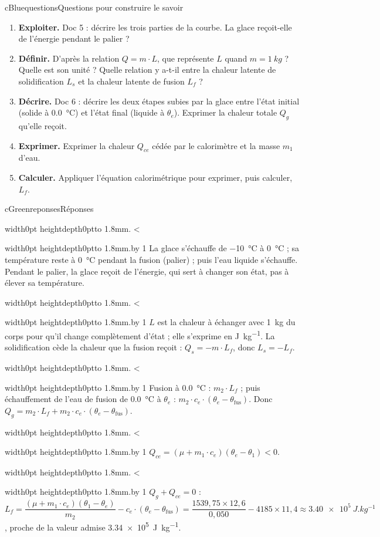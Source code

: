 \documentclass[11pt,a4paper]{article}
\newcommand{\kw}[1]{{\sffamily\bfseries\color{cBlue}#1}}   %
\newif\ifeleve
\newlength{\interligne}\setlength{\interligne}{7mm}
\newlength{\replen}
\newcommand{\pointilles}{{\color{cInk2!60}\leaders\hbox to 1.8mm{\hss.\hss}\hfill}\kern0pt}
\newcommand{\lignes}[1]{\leavevmode\vrule width0pt height\dimexpr\interligne-1mm\relax depth0pt\pointilles
  \lgn=1 \loop\ifnum\lgn<#1 \par\nointerlineskip\noindent\vrule width0pt height\interligne depth0pt\pointilles\advance\lgn by 1 \repeat}
\newcommand{\rep}[1]{%
  \ifeleve
    \sbox{\repbox}{\parbox{\linewidth}{#1}}%
    \replen=\dimexpr\ht\repbox+\dp\repbox\relax
    \repn=\numexpr\replen/\baselineskip+1\relax
    \ifnum\repn<2 \repn=2\fi
    \edef\nblignes{\the\repn}\lignes{\nblignes}%
  \else #1\fi}
\newcommand{\titrereponses}{\ifeleve Mes réponses\else Réponses\fi}
\newcommand{\tfus}{\theta_{\mathrm{fus}}}
\newcommand{\dC}[1]{\qty{#1}{\degreeCelsius}}
\begin{document}
\begin{rub}{cBlue}{questions}{Questions pour construire le savoir}
\begin{enumerate}
  \item \kw{Exploiter.} Doc 5 : décrire les trois parties de la courbe. La glace reçoit-elle de l’énergie pendant le palier ?
  \item \kw{Définir.} D’après la relation $Q = m\cdot L$, que représente $L$ quand $m = \qty{1}{kg}$ ? Quelle est son unité ? Quelle relation y a-t-il entre la chaleur latente de solidification $L_s$ et la chaleur latente de fusion $L_f$ ?
  \item \kw{Décrire.} Doc 6 : décrire les deux étapes subies par la glace entre l’état initial (solide à \dC{0,0}) et l’état final (liquide à $\theta_e$). Exprimer la chaleur totale $Q_g$ qu’elle reçoit.
  \item \kw{Exprimer.} Exprimer la chaleur $Q_{ce}$ cédée par le calorimètre et la masse $m_1$ d’eau.
  \item \kw{Calculer.} Appliquer l’équation calorimétrique pour exprimer, puis calculer, $L_f$.
\end{enumerate}
\end{rub}

\begin{rub}{cGreen}{reponses}{\titrereponses}
\begin{reps}
  \item \rep{La glace s’échauffe de \dC{-10} à \dC{0} ; sa température reste à \dC{0} pendant la fusion (palier) ; puis l’eau liquide s’échauffe. Pendant le palier, la glace reçoit de l’énergie, qui sert à changer son état, pas à élever sa température.}
  \item \rep{$L$ est la chaleur à échanger avec \qty{1}{kg} du corps pour qu’il change complètement d’état ; elle s’exprime en \unit{J.kg^{-1}}. La solidification cède la chaleur que la fusion reçoit : $Q_s = -m\cdot L_f$, donc $L_s = -L_f$.}
  \item \rep{Fusion à \dC{0,0} : $m_2\cdot L_f$ ; puis échauffement de l’eau de fusion de \dC{0,0} à $\theta_e$ : $m_2\cdot c_e\cdot(\theta_e - \tfus)$. Donc $Q_g = m_2\cdot L_f + m_2\cdot c_e\cdot(\theta_e - \tfus)$.}
  \item \rep{$Q_{ce} = (\mu + m_1\cdot c_e)(\theta_e - \theta_1) < 0$.}
  \item \rep{$Q_g + Q_{ce} = 0$ : $L_f = \dfrac{(\mu + m_1\cdot c_e)(\theta_1 - \theta_e)}{m_2} - c_e\cdot(\theta_e - \tfus) = \dfrac{1539{,}75\times12{,}6}{0{,}050} - 4185\times11{,}4 \approx \qty{3,40e5}{J.kg^{-1}}$, proche de la valeur admise \qty{3,34e5}{J.kg^{-1}}.}
\end{reps}
\end{rub}
\end{document}
